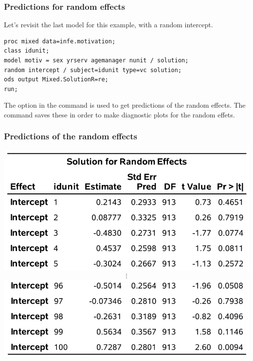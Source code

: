 \documentclass{beamer}
\begin{document}
\begin{frame}[fragile]
\frametitle{Predictions for random effects}
Let's revisit the last model for this example, with a random intercept.
\begin{tcolorbox}[colback=white, colframe=hecblue, title=\SASlang{} code for the random intercept model]
\begin{small}
\begin{verbatim}
proc mixed data=infe.motivation;
class idunit;
model motiv = sex yrserv agemanager nunit / solution;
random intercept / subject=idunit type=vc solution;
ods output Mixed.SolutionR=re;
run;
\end{verbatim}
\end{small}
\end{tcolorbox}
\begin{small} The option  in the command  is used to get predictions of the random effects. The command 
saves these in order to make diagnostic plots for the random effets.\end{small}
\end{frame}

\begin{frame}
\frametitle{Predictions of the random effects}
\begin{center}
\includegraphics[width = 0.7\linewidth]{img/c6/slides7-e19}
\begin{align*}
 \vdots
\end{align*}
\includegraphics[width = 0.7\linewidth]{img/c6/slides7-e20}
\end{center}
\end{frame}
\end{document}
